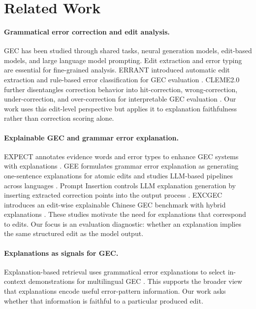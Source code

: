 \section{Related Work}

\paragraph{Grammatical error correction and edit analysis.}
GEC has been studied through shared tasks, neural generation models, edit-based models, and large language model prompting. Edit extraction and error typing are essential for fine-grained analysis. ERRANT introduced automatic edit extraction and rule-based error classification for GEC evaluation \cite{bryant-etal-2017-automatic}. CLEME2.0 further disentangles correction behavior into hit-correction, wrong-correction, under-correction, and over-correction for interpretable GEC evaluation \cite{ye-etal-2025-cleme2}. Our work uses this edit-level perspective but applies it to explanation faithfulness rather than correction scoring alone.

\paragraph{Explainable GEC and grammar error explanation.}
EXPECT annotates evidence words and error types to enhance GEC systems with explanations \cite{fei-etal-2023-enhancing}. GEE formulates grammar error explanation as generating one-sentence explanations for atomic edits and studies LLM-based pipelines across languages \cite{song-etal-2024-gee}. Prompt Insertion controls LLM explanation generation by inserting extracted correction points into the output process \cite{kaneko-okazaki-2024-controlled}. EXCGEC introduces an edit-wise explainable Chinese GEC benchmark with hybrid explanations \cite{ye2025excgec}. These studies motivate the need for explanations that correspond to edits. Our focus is an evaluation diagnostic: whether an explanation implies the same structured edit as the model output.

\paragraph{Explanations as signals for GEC.}
Explanation-based retrieval uses grammatical error explanations to select in-context demonstrations for multilingual GEC \cite{li-etal-2025-explanation}. This supports the broader view that explanations encode useful error-pattern information. Our work asks whether that information is faithful to a particular produced edit.

